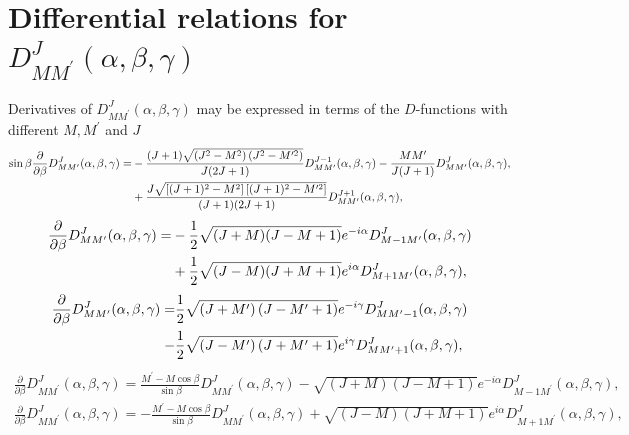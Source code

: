 \section{Differential relations for $D_{M M^{\prime}}^{J}(\alpha, \beta, \gamma)$}\label{sec:4.9}
Derivatives of $D_{M M^{\prime}}^{J}(\alpha, \beta, \gamma)$ may be expressed in terms of the $D$-functions with different $M, M^{\prime}$ and $J$
\begin{align}
\sin \beta \frac{\partial}{\partial \beta} D_{M M^{\prime}}^{J}(\alpha, \beta, \gamma)=&-\frac{(J+1) \sqrt{\left(J^{2}-M^{2}\right)\left(J^{2}-M^{\prime 2}\right)}}{J(2 J+1)} D_{M M^{\prime}}^{J-1}(\alpha, \beta, \gamma)-\frac{M M^{\prime}}{J(J+1)} D_{M M^{\prime}}^{J}(\alpha, \beta, \gamma)  ,\notag\\
&+\frac{J \sqrt{\left[(J+1)^{2}-M^{2}\right]\left[(J+1)^{2}-M^{\prime 2}\right]}}{(J+1)(2 J+1)} D_{M M^{\prime}}^{J+1}(\alpha, \beta, \gamma)  ,\label{eq:4:9:1}
\end{align}
\begin{align}
\frac{\partial}{\partial \beta} D_{M M^{\prime}}^{J}(\alpha, \beta, \gamma)= & -\frac{1}{2} \sqrt{(J+M)(J-M+1)} e^{-i \alpha} D_{M-1 M^{\prime}}^{J}(\alpha, \beta, \gamma) \notag\\
& +\frac{1}{2} \sqrt{(J-M)(J+M+1)} e^{i \alpha} D_{M+1 M^{\prime}}^{J}(\alpha, \beta, \gamma), \label{eq:4:9:2}
\end{align} 
\begin{align}
\frac{\partial}{\partial \beta} D_{M M^{\prime}}^{J}(\alpha, \beta, \gamma)=&\frac{1}{2} \sqrt{\left(J+M^{\prime}\right)\left(J-M^{\prime}+1\right)} e^{-i \gamma} D_{M M^{\prime}-1}^{J}(\alpha, \beta, \gamma) \notag\\
-&\frac{1}{2} \sqrt{\left(J-M^{\prime}\right)\left(J+M^{\prime}+1\right)} e^{i \gamma} D_{M M^{\prime}+1}^{J}(\alpha, \beta, \gamma)  ,\label{eq:4:9:3}
\end{align}
\begin{align}
\frac{\partial}{\partial \beta} D_{M M^{\prime}}^{J}(\alpha, \beta, \gamma)=\frac{M^{\prime}-M \cos \beta}{\sin \beta} D_{M M^{\prime}}^{J}(\alpha, \beta, \gamma)-\sqrt{(J+M)(J-M+1)} e^{-i \alpha} D_{M-1 M^{\prime}}^{J}(\alpha, \beta, \gamma)  ,\label{eq:4:9:4}
\end{align}
\begin{align}
\frac{\partial}{\partial \beta} D_{M M^{\prime}}^{J}(\alpha, \beta, \gamma)=-\frac{M^{\prime}-M \cos \beta}{\sin \beta} D_{M M^{\prime}}^{J}(\alpha, \beta, \gamma)+\sqrt{(J-M)(J+M+1)} e^{i \alpha} D_{M+1 M^{\prime}}^{J}(\alpha, \beta, \gamma) , \label{eq:4:9:5}
\end{align}
